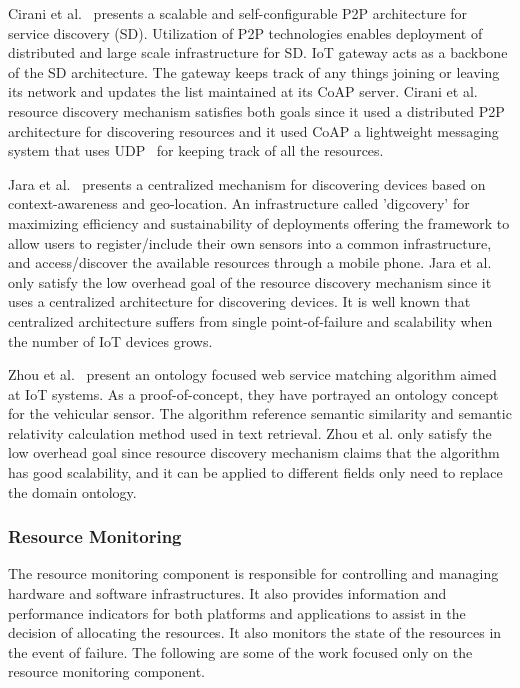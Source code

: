 Cirani et al.~\cite{6899579} presents a scalable and self-configurable P2P architecture for service discovery (SD). Utilization of
P2P technologies enables deployment of distributed and large scale infrastructure for SD. IoT gateway acts as a backbone of the SD architecture. The gateway keeps track of any things joining or leaving its network and updates the list maintained at its CoAP server. Cirani et al. resource discovery mechanism satisfies both goals since it used a distributed P2P architecture for discovering resources and it used CoAP a lightweight messaging system that uses UDP~\cite{8088251} for keeping track of all the resources.

Jara et al.~\cite{6550579} presents a centralized mechanism for discovering devices based on context-awareness and geo-location. An infrastructure called 'digcovery' for maximizing efficiency and sustainability of deployments offering the framework to allow users to register/include their own sensors into a common infrastructure, and access/discover the available resources through a mobile phone. Jara et al. only satisfy the low overhead goal of the resource discovery mechanism since it uses a centralized architecture for discovering devices. It is well known that centralized architecture suffers from single point-of-failure and scalability when the number of IoT devices grows. 

Zhou et al.~\cite{6664533} present an ontology focused web service matching algorithm aimed at IoT systems. As a proof-of-concept, they have portrayed an ontology concept for the vehicular sensor. The algorithm reference semantic similarity and semantic relativity calculation method used in text retrieval. Zhou et al. only satisfy the low overhead goal since resource discovery mechanism claims that the algorithm has good scalability, and it can be applied to different fields only need to replace the domain ontology.

\subsubsection{Resource Monitoring}
The resource monitoring component is responsible for controlling and managing hardware and software infrastructures. It also provides information and performance indicators for both platforms and applications to assist in the decision of allocating the resources. It also monitors the state of the resources in the event of failure. The following are some of the work focused only on the resource monitoring component.

